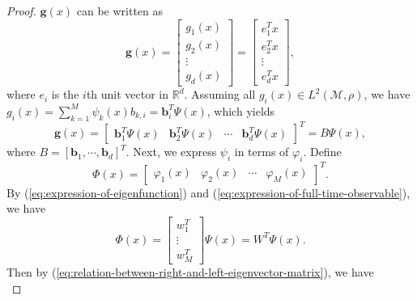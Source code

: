 \begin{proof}
  $\mathbf{g}(x)$ can be written as
  \begin{equation*}
    \mathbf{g}(x) = \left[
      \begin{array}{c}
        g_1(x)\\
        g_2(x)\\
        \vdots\\
        g_d(x)
      \end{array}
    \right] = \left[
      \begin{array}{c}
        e^T_1x\\
        e^T_2x\\
        \vdots\\
        e^T_dx
      \end{array}
    \right],
  \end{equation*}
  where $e_i$ is the $i$th unit vector in $\mathbb{R}^d$.
  Assuming all $g_i(x) \in L^2(\mathcal{M}, \rho)$,
  we have $g_i(x) = \sum\limits_{k = 1}^M \psi_k(x) b_{k,i} = \mathbf{b}_i^T \Psi(x)$,
  which yields
  \begin{equation}
    \label{eq:expression-of-full-time-observable}
    \mathbf{g}(x) = \left[
      \begin{array}{cccc}
        \mathbf{b}_1^T\Psi(x)&\mathbf{b}_2^T\Psi(x)&\cdots&\mathbf{b}_d^T\Psi(x)
      \end{array}
    \right]^T
    = B\Psi(x),
  \end{equation}
  where $B = [\mathbf{b}_1,\cdots,\mathbf{b}_d]^T$.
  Next, we express $\psi_i$ in terms of $\varphi_i$.
  Define
  \begin{equation*}
    \Phi(x) = \left[
      \begin{array}{cccc}
        \varphi_1(x)&\varphi_2(x)&\cdots&\varphi_M(x)
      \end{array}
    \right]^T.
  \end{equation*}
  By (\ref{eq:expression-of-eigenfunction})
  and (\ref{eq:expression-of-full-time-observable}),
  we have
  \begin{equation*}
    \Phi(x) = \left[
      \begin{array}{c}
        w_1^T\\
        \vdots\\
        w_M^T
      \end{array}
    \right] \Psi(x) = W^T \Psi(x).
  \end{equation*}
  Then by (\ref{eq:relation-between-right-and-left-eigenvector-matrix}),
  we have
  \begin{equation}

\end{equation}
\end{proof}
